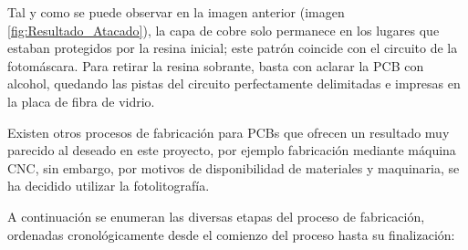 \begin{itemize}
    Tal y como se puede observar en la imagen anterior (imagen \ref{fig:Resultado_Atacado}), la capa de cobre solo permanece en los lugares que estaban protegidos por la resina inicial; este patrón coincide con el circuito de la fotomáscara. Para retirar la resina sobrante, basta con aclarar la \ac{PCB} con alcohol, quedando las pistas del circuito perfectamente delimitadas e impresas en la placa de fibra de vidrio.
    
\end{itemize}

Existen otros procesos de fabricación para \ac{PCB}s que ofrecen un resultado muy parecido al deseado en este proyecto, por ejemplo fabricación mediante máquina CNC, sin embargo, por motivos de disponibilidad de materiales y maquinaria, se ha decidido utilizar la fotolitografía.

A continuación se enumeran las diversas etapas del proceso de fabricación, ordenadas cronológicamente desde el comienzo del proceso hasta su finalización:

